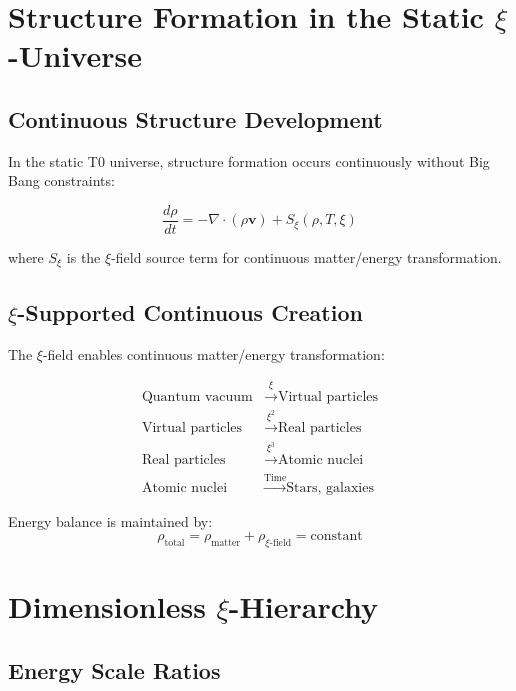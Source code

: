 \documentclass[12pt,a4paper]{article}
\begin{document}
	\section{Structure Formation in the Static $\xi$-Universe}
	
	\subsection{Continuous Structure Development}
	
	In the static T0 universe, structure formation occurs continuously without Big Bang constraints:
	
	\begin{equation}
		\frac{d\rho}{dt} = -\nabla \cdot (\rho \mathbf{v}) + S_\xi(\rho, T, \xi)
	\end{equation}
	
	where $S_\xi$ is the $\xi$-field source term for continuous matter/energy transformation.
	
	\subsection{$\xi$-Supported Continuous Creation}
	
	The $\xi$-field enables continuous matter/energy transformation:
	
	\begin{align}
		\text{Quantum vacuum} &\xrightarrow{\xi} \text{Virtual particles} \\
		\text{Virtual particles} &\xrightarrow{\xi^2} \text{Real particles} \\
		\text{Real particles} &\xrightarrow{\xi^3} \text{Atomic nuclei} \\
		\text{Atomic nuclei} &\xrightarrow{\text{Time}} \text{Stars, galaxies}
	\end{align}
	
	Energy balance is maintained by:
	\begin{equation}
		\rho_{\text{total}} = \rho_{\text{matter}} + \rho_{\xi\text{-field}} = \text{constant}
	\end{equation}
	
	\section{Dimensionless $\xi$-Hierarchy}
	
	\subsection{Energy Scale Ratios}
	
\end{document}
